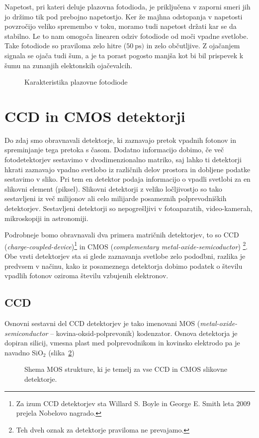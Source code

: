 Napetost, pri kateri deluje plazovna fotodioda, je priključena v zaporni smeri jih jo 
držimo tik pod prebojno napetostjo. Ker že  majhna odstopanja v napetosti povzročijo veliko
spremembo v toku, moramo tudi napetost držati kar se da stabilno. Le to nam omogoča
linearen odziv fotodiode od moči vpadne svetlobe. Take fotodiode so praviloma zelo hitre 
($50~\si{\pico\second})$ in zelo občutljive. Z ojačanjem signala se ojača tudi šum, a je ta 
porast pogosto manjša kot bi bil prispevek k šumu na zunanjih elektonskih ojačevalcih. 

\begin{figure}[h]
\centering
\def\svgwidth{80truemm} 

\caption{Karakteristika plazovne fotodiode}
\label{11_plaz}
\end{figure}

\section{CCD in CMOS detektorji}
Do zdaj smo obravnavali detektorje, ki zaznavajo pretok vpadnih fotonov in spreminjanje
tega pretoka s časom. Dodatno informacijo dobimo, če več fotodetektorjev sestavimo v 
dvodimenzionalno matriko, saj lahko ti detektorji hkrati zaznavajo vpadno svetlobo 
iz različnih delov prostora in dobljene podatke sestavimo v sliko. Pri tem en detektor
podaja informacijo o vpadli svetlobi za en slikovni element (piksel). Slikovni
detektorji z veliko ločljivostjo so tako sestavljeni iz več milijonov ali celo 
milijarde posameznih polprevodniških detektorjev. Sestavljeni detektorji so 
nepogrešljivi v fotoaparatih, video-kamerah, mikroskopiji in astronomiji.

Podrobneje bomo obravnavali dva primera matričnih detektorjev, to so CCD 
({\it charge-coupled-device})\footnote{Za izum CCD detektorjev sta Willard 
S. Boyle in George E. Smith  leta 2009 prejela Nobelovo nagrado.} 
in CMOS ({\it complementary metal-oxide-semicoductor})
\footnote{Teh dveh oznak za detektorje praviloma ne prevajamo.}. Obe vrsti
detektorjev sta si glede zaznavanja svetlobe zelo pododbni, razlika
je predvsem v načinu, kako iz posameznega detektorja dobimo podatek o številu 
vpadlih fotonov oziroma številu vzbujenih elektronov.

\subsection*{CCD}
Osnovni sestavni del CCD detektorjev je tako imenovani MOS ({\it metal-oxide-semiconductor}
-- kovina-oksid-polprevonik) kodenzator. Osnova detektorja je dopiran silicij, vmesna 
plast med polprevodnikom in kovinsko elektrodo pa je navadno SiO$_2$ (slika~\ref{11_CCD})
\begin{figure}[h]
\centering
\def\svgwidth{80truemm} 
%
\caption{Shema MOS strukture, ki je temelj za vse CCD in CMOS slikovne detektorje.}
\label{11_CCD}
\end{figure}


